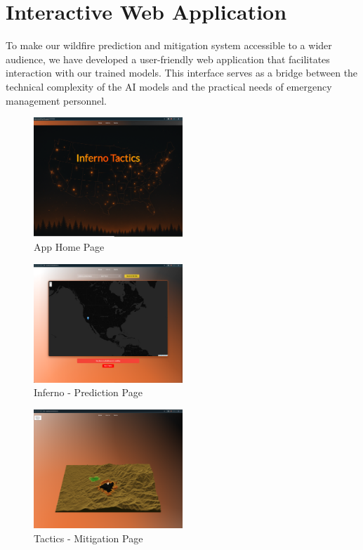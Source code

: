 \documentclass[conference]{IEEEtran}
\begin{document}
\section{Interactive Web Application}

To make our wildfire prediction and mitigation system accessible to a wider audience, we have developed a user-friendly web application that facilitates interaction with our trained models. This interface serves as a bridge between the technical complexity of the AI models and the practical needs of emergency management personnel.

\begin{figure}[H]
    \centering
    \includegraphics[width=0.5\textwidth]{home.png}
    \caption{App Home Page}
    \end{figure}

    \begin{figure}[H]
        \centering
        \includegraphics[width=0.5\textwidth]{inferno.png}
        \caption{Inferno - Prediction Page}
        \end{figure}

        \begin{figure}[H]
            \centering
            \includegraphics[width=0.5\textwidth]{tactix.png}
            \caption{Tactics - Mitigation Page}
            \end{figure}
\end{document}
